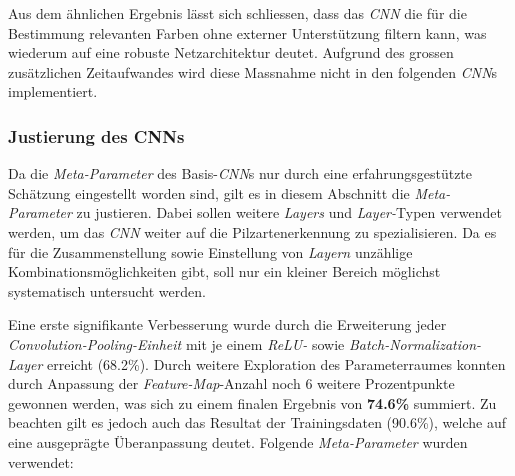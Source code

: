 
Aus dem ähnlichen Ergebnis lässt sich schliessen, dass das \textit{CNN} die für die Bestimmung relevanten Farben ohne externer Unterstützung filtern kann, was wiederum auf eine robuste Netzarchitektur deutet. Aufgrund des grossen zusätzlichen Zeitaufwandes wird diese Massnahme nicht in den folgenden \textit{CNN}s implementiert.

\subsubsection{Justierung des CNNs}\label{cha:met:adjcnn}
Da die \textit{Meta-Parameter} des Basis-\textit{CNN}s nur durch eine erfahrungsgestützte Schätzung eingestellt worden sind, gilt es in diesem Abschnitt die \textit{Meta-Parameter} zu justieren. Dabei sollen weitere \textit{Layers} und \textit{Layer-}Typen verwendet werden, um das \textit{CNN} weiter auf die Pilzartenerkennung zu spezialisieren. Da es für die Zusammenstellung sowie Einstellung von \textit{Layern} unzählige Kombinationsmöglichkeiten gibt, soll nur ein kleiner Bereich möglichst systematisch untersucht werden.

Eine erste signifikante Verbesserung wurde durch die Erweiterung jeder \textit{Convolution-Pooling-Einheit} mit je einem \textit{ReLU-} sowie \textit{Batch-Normalization-Layer} erreicht (68.2\%). Durch weitere Exploration des Parameterraumes konnten durch Anpassung der \textit{Feature-Map}-Anzahl noch 6 weitere Prozentpunkte gewonnen werden, was sich zu einem finalen Ergebnis von \textbf{74.6\%} summiert. Zu beachten gilt es jedoch auch das Resultat der Trainingsdaten (90.6\%), welche auf eine ausgeprägte Überanpassung deutet. Folgende \textit{Meta-Parameter} wurden verwendet:


